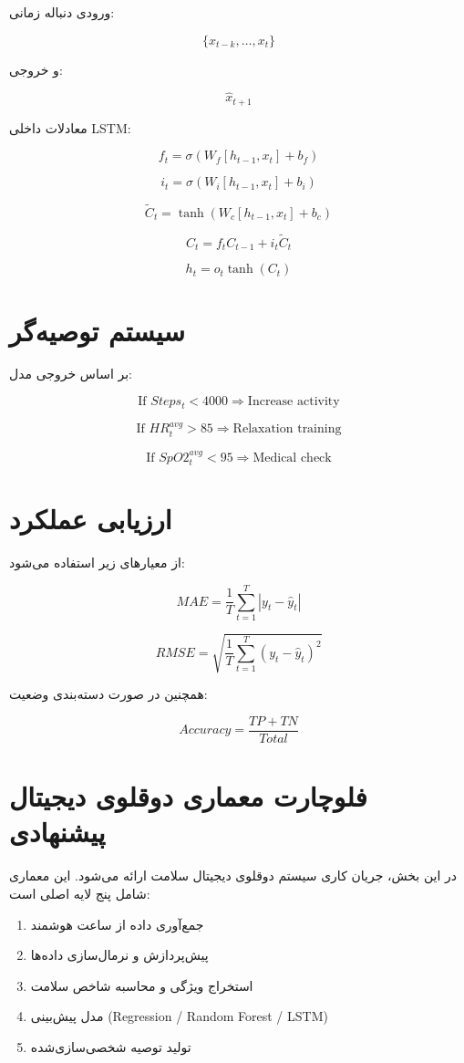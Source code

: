 \documentclass[12pt,a4paper]{article}
\begin{document}
	ورودی دنباله زمانی:
	
	\[
	\{x_{t-k}, \dots, x_t\}
	\]
	
	و خروجی:
	
	\[
	\hat{x}_{t+1}
	\]
	
	معادلات داخلی LSTM:
	
	\[
	f_t = \sigma(W_f [h_{t-1}, x_t] + b_f)
	\]
	
	\[
	i_t = \sigma(W_i [h_{t-1}, x_t] + b_i)
	\]
	
	\[
	\tilde{C}_t = \tanh(W_c [h_{t-1}, x_t] + b_c)
	\]
	
	\[
	C_t = f_t C_{t-1} + i_t \tilde{C}_t
	\]
	
	\[
	h_t = o_t \tanh(C_t)
	\]
	
	\section{سیستم توصیه‌گر}
	
	بر اساس خروجی مدل:
	
	\[
	\text{If } Steps_t < 4000 \Rightarrow \text{Increase activity}
	\]
	
	\[
	\text{If } HR^{avg}_t > 85 \Rightarrow \text{Relaxation training}
	\]
	
	\[
	\text{If } SpO2^{avg}_t < 95 \Rightarrow \text{Medical check}
	\]
	
	\section{ارزیابی عملکرد}
	
	از معیارهای زیر استفاده می‌شود:
	
	\[
	MAE = \frac{1}{T} \sum_{t=1}^{T} |y_t - \hat{y}_t|
	\]
	
	\[
	RMSE = \sqrt{\frac{1}{T} \sum_{t=1}^{T} (y_t - \hat{y}_t)^2}
	\]
	
	همچنین در صورت دسته‌بندی وضعیت:
	
	\[
	Accuracy = \frac{TP + TN}{Total}
	\]
	
	\section{فلوچارت معماری دوقلوی دیجیتال پیشنهادی}
	
	در این بخش، جریان کاری سیستم دوقلوی دیجیتال سلامت ارائه می‌شود. 
	این معماری شامل پنج لایه اصلی است:
	
	\begin{enumerate}
		\item جمع‌آوری داده از ساعت هوشمند
		\item پیش‌پردازش و نرمال‌سازی داده‌ها
		\item استخراج ویژگی و محاسبه شاخص سلامت
		\item مدل پیش‌بینی (Regression / Random Forest / LSTM)
		\item تولید توصیه شخصی‌سازی‌شده
	\end{enumerate}
	
\end{document}
